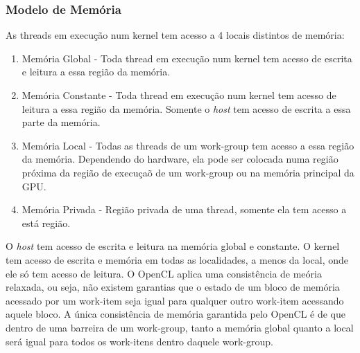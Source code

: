 \subsubsection{Modelo de Memória}
As threads em execução num kernel tem acesso a 4 locais distintos de memória:

\begin{enumerate}
  \item Memória Global - Toda thread em execução num kernel tem acesso de escrita e leitura a essa região da memória.
  \item Memória Constante - Toda thread em execução num kernel tem acesso de leitura a essa região da memória. Somente o \textit{host} tem acesso de
    escrita a essa parte da memória.
  \item Memória Local - Todas as threads de um work-group tem acesso a essa região da memória. Dependendo do hardware, ela pode ser colocada numa região próxima
    da região de execuçaõ de um work-group ou na memória principal da GPU.
  \item Memória Privada - Região privada de uma thread, somente ela tem acesso a está região.
\end{enumerate}

O \textit{host} tem acesso de escrita e leitura na memória global e constante. O kernel tem acesso de escrita e memória em todas as localidades, a menos da local, 
onde ele só tem acesso de leitura. O OpenCL aplica uma consistência de meória relaxada, ou seja, não existem garantias que o estado de um bloco de memória 
acessado por um work-item seja igual para qualquer outro work-item acessando aquele bloco. A única consistência de memória garantida pelo OpenCL é de que dentro 
de uma barreira de um work-group, tanto a memória global quanto a local será igual para todos os work-itens dentro daquele work-group.

